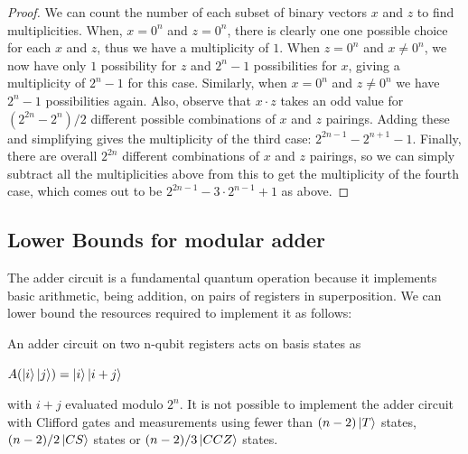 \documentclass[12pt]{dalthesis}
\begin{document}
\begin{proof}
We can count the number of each subset of binary vectors $x$ and $z$ to find multiplicities. When, $x=0^n$ and $z = 0^n$, there is clearly one one possible choice for each $x$ and $z$, thus we have a multiplicity of $1$. When $z = 0^n$ and $x \neq 0^n$, we now have only $1$ possibility for $z$ and $2^n - 1$ possibilities for $x$, giving a multiplicity of $2^n - 1$ for this case. Similarly, when $x = 0^n$ and $z \neq 0^n$ we have $2^n - 1$ possibilities again. Also, observe that $x \cdot z$ takes an odd value for $(2^{2n}-2^{n})/2$ different possible combinations of $x$ and $z$ pairings. Adding these and simplifying gives the multiplicity of the third case: $2^{2n-1} - 2^{n+1} - 1$. Finally, there are overall $2^{2n}$ different combinations of $x$ and $z$ pairings, so we can simply subtract all the multiplicities above from this to get the multiplicity of the fourth case, which comes out to be $2^{2n-1} - 3 \cdot 2^{n-1} + 1$ as above.
\end{proof}

\subsection{Lower Bounds for modular adder}
The adder circuit is a fundamental quantum operation because it implements basic arithmetic, being addition, on pairs of registers in superposition. We can lower bound the resources required to implement it as follows:

\begin{proposition}
An adder circuit on two n-qubit registers acts on basis states as 
\begin{center}
$A(\ket{i} \ket{j}) = \ket{i} \ket{i+j}$
\end{center}
with $i + j$ evaluated modulo $2^n$. It is not possible to implement the adder circuit with Clifford gates and measurements using fewer than $(n-2) \ket{T}$ states, $(n-2)/2 \ket{CS}$ states or $(n-2)/3 \ket{CCZ}$ states.
\end{proposition}
\end{document}
